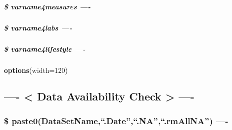 \documentclass[
]{article}
\newenvironment{Shaded}{\begin{snugshade}}{\end{snugshade}}
\newcommand{\AttributeTok}[1]{\textcolor[rgb]{0.13,0.29,0.53}{#1}}
\newcommand{\DecValTok}[1]{\textcolor[rgb]{0.00,0.00,0.81}{#1}}
\newcommand{\FunctionTok}[1]{\textcolor[rgb]{0.13,0.29,0.53}{\textbf{#1}}}
\newcommand{\NormalTok}[1]{#1}
\begin{document}
\hypertarget{varname4measures--}{%
\subparagraph{\$ varname4measures ----}\label{varname4measures--}}

\hypertarget{varname4labs--}{%
\subparagraph{\$ varname4labs ----}\label{varname4labs--}}

\hypertarget{varname4lifestyle--}{%
\subparagraph{\$ varname4lifestyle ----}\label{varname4lifestyle--}}

\begin{Shaded}
\begin{Highlighting}[]
\FunctionTok{options}\NormalTok{(}\AttributeTok{width=}\DecValTok{120}\NormalTok{)}
\end{Highlighting}
\end{Shaded}

\hypertarget{data-availability-check--}{%
\subsection{---- \textless{} Data Availability Check \textgreater{}
----}\label{data-availability-check--}}

\hypertarget{paste0datasetname.date.na.rmallna--}{%
\subsubsection{\$ paste0(DataSetName,``.Date'',``.NA'',``.rmAllNA'')
----}\label{paste0datasetname.date.na.rmallna--}}
\end{document}

